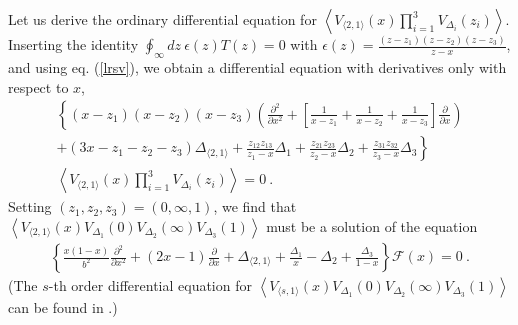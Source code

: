 \documentclass[12pt,a4paper,notitlepage]{report}
\newcommand \la {\left\langle}
\newcommand \ra {\right\rangle}
\newcommand \p {\partial}
\newcommand \pp[1] {{\frac{\p}{\p #1}}}
\numberwithin{equation}{section}
\theoremstyle{break}
\begin{document}
Let us derive the ordinary differential equation for $\la V_{\langle 2,1 \rangle}(x)\prod_{i=1}^3 V_{\Delta_i}(z_i)\ra$. Inserting the identity $\oint_\infty dz\ \epsilon(z) T(z) =0$ with $\epsilon(z) = \frac{(z-z_1)(z-z_2)(z-z_3)}{z-x}$, and using eq. (\ref{lrsv}), we obtain a differential equation with derivatives only with respect to $x$, 
\begin{multline}
  \left\{ (x-z_1)(x-z_2)(x-z_3)\left(\frac{\p^2}{\p x^2} +\left[\frac{1}{x-z_1}+\frac{1}{x-z_2}+\frac{1}{x-z_3}\right] \pp{x} \right) \right.
\\ 
\left. + (3x-z_1-z_2-z_3)\Delta_{\langle 2,1 \rangle} +\frac{z_{12}z_{13}}{z_1-x}\Delta_1 + \frac{z_{21}z_{23}}{z_2-x}\Delta_2+\frac{z_{31}z_{32}}{z_3-x}\Delta_3\right\} 
\\
\la V_{\langle 2,1 \rangle}(x)\prod_{i=1}^3 V_{\Delta_i}(z_i)\ra  = 0\ . 
\end{multline}
Setting $(z_1,z_2,z_3)=(0,\infty,1)$, we find that $\la V_{\langle 2,1 \rangle}(x)V_{\Delta_1}(0)V_{\Delta_2}(\infty)V_{\Delta_3}(1)\ra$ must be a solution of the equation
\begin{align}
  \left\{ \frac{x(1-x)}{b^2}\frac{\p^2}{\p x^2} + (2x-1)\pp{x} +\Delta_{\langle 2,1 \rangle} +\frac{\Delta_1}{x}-\Delta_2 + \frac{\Delta_3}{1-x}\right\} \mathcal{F}(x)=0\ .
\label{sode}
\end{align}
(The $s$-th order differential equation for $\la V_{\langle s,1 \rangle}(x)V_{\Delta_1}(0)V_{\Delta_2}(\infty)V_{\Delta_3}(1)\ra $ can be found in \cite{flno09}.)
\end{document}
